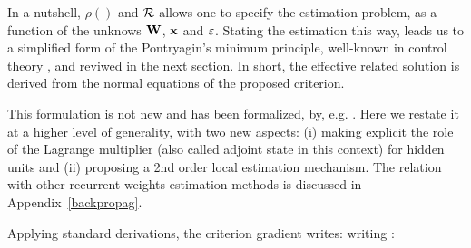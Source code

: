 In a nutshell, $\rho()$ and ${\cal R}$ allows one to specify the estimation problem, as a function of the unknows ${\bf W}$, ${\bf x}$ and ${\bf \varepsilon}$. Stating the estimation this way, leads us to a simplified form of the Pontryagin's minimum principle, well-known in control theory \cite{astrom:83}, and reviwed in the next section. In short, the effective related solution is derived from the normal equations of the proposed criterion.

This formulation is not new and has been formalized, by, e.g. \cite{cun_theoretical_1988}. Here we restate it at a higher level of generality, with two new aspects: (i) making explicit the role of the Lagrange multiplier (also called adjoint state in this context) for hidden units and (ii) proposing a 2nd order local estimation mechanism. The relation with other recurrent weights estimation methods is discussed in Appendix~\ref{backpropag}.

Applying standard derivations, the criterion gradient writes:
writing : 
{\small {}}

